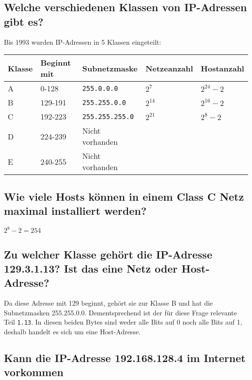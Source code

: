 \documentclass{article}
\begin{document}
\subsection{Welche verschiedenen Klassen von IP-Adressen gibt es?}

Bis 1993 wurden IP-Adressen in 5 Klassen eingeteilt:

\begin{center}
	\begin{tabular}{|l|l|l|l|l|}
		\hline
		\textbf{Klasse} & \textbf{Beginnt mit} & \textbf{Subnetzmaske}  & \textbf{Netzeanzahl} & \textbf{Hostanzahl} \\
		\hline
		A               & 0-128            & \texttt{255.0.0.0}     & $2^7$                & $2^{24} - 2$        \\
		\hline
		B               & 129-191          & \texttt{255.255.0.0}   & $2^14$               & $2^{16} - 2$        \\
		\hline
		C               & 192-223          & \texttt{255.255.255.0} & $2^21$               & $2^{8} - 2$         \\
		\hline
		D               & 224-239          & Nicht vorhanden        &                      &                     \\
		\hline
		E               & 240-255          & Nicht vorhanden        &                      &                     \\
		\hline
	\end{tabular}
\end{center}

\subsection{Wie viele Hosts können in einem Class C Netz maximal installiert werden?}

$2^8 - 2 = 254$

\subsection{Zu welcher Klasse gehört die IP-Adresse 129.3.1.13? Ist das eine Netz oder Host-Adresse?}

Da diese Adresse mit 129 beginnt, gehört sie zur Klasse B und hat die Subnetzmasken 255.255.0.0.
Dementsprechend ist der für diese Frage relevante Teil \texttt{1.13}. In diesen beiden Bytes sind
weder alle Bits auf 0 noch alle Bits auf 1, deshalb handelt es sich um eine Host-Adresse.

\subsection{Kann die IP-Adresse 192.168.128.4 im Internet vorkommen}
\end{document}
